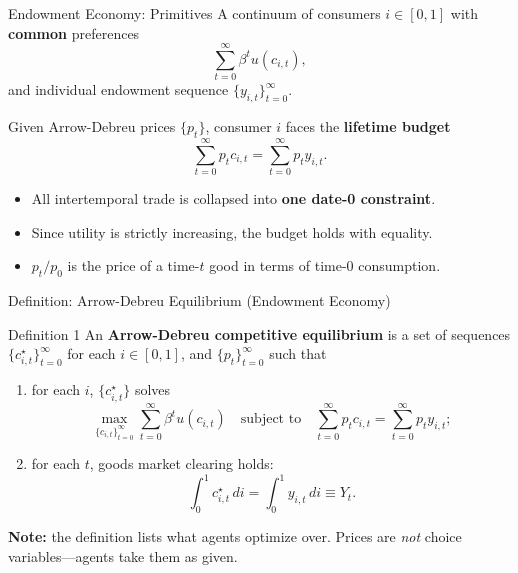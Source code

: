 \documentclass[aspectratio=169,10pt]{beamer}
\begin{document}

\begin{frame}{Endowment Economy: Primitives}
A continuum of consumers $i\in[0,1]$ with \textbf{common} preferences
\[
\sum_{t=0}^{\infty}\beta^t u(c_{i,t}),
\tag{5.1}
\]
and individual endowment sequence $\{y_{i,t}\}_{t=0}^\infty$.

\medskip
Given Arrow-Debreu prices $\{p_t\}$, consumer $i$ faces the \textbf{lifetime budget}
\[
\sum_{t=0}^{\infty} p_t c_{i,t}
=
\sum_{t=0}^{\infty} p_t y_{i,t}.
\tag{5.2}
\]

\begin{itemize}
  \item All intertemporal trade is collapsed into \textbf{one date-0 constraint}.
  \item Since utility is strictly increasing, the budget holds with equality.
  \item $p_t/p_0$ is the price of a time-$t$ good in terms of time-0 consumption.
\end{itemize}
\end{frame}

\begin{frame}{Definition: Arrow-Debreu Equilibrium (Endowment Economy)}
\hypertarget{m-a1}{}

\begin{block}{Definition 1}
An \textbf{Arrow-Debreu competitive equilibrium} is a set of sequences $\{c_{i,t}^\star\}_{t=0}^{\infty}$ for each $i\in[0,1]$, and $\{p_t\}_{t=0}^{\infty}$ such that
\begin{enumerate}
  \item for each $i$, $\{c_{i,t}^\star\}$ solves
\[
\max_{\{c_{i,t}\}_{t=0}^{\infty}} \sum_{t=0}^{\infty}\beta^t u(c_{i,t})
\quad
\text{subject to}
\quad
\sum_{t=0}^{\infty} p_t c_{i,t}
=
\sum_{t=0}^{\infty} p_t y_{i,t};
\]
  \item for each $t$, goods market clearing holds:
\[
\int_0^1 c_{i,t}^\star\,di
=
\int_0^1 y_{i,t}\,di
\equiv Y_t.
\]
\end{enumerate}
\end{block}

\medskip
\textbf{Note:} the definition lists what agents optimize over. Prices are \emph{not} choice variables---agents take them as given.
\end{frame}
\end{document}
